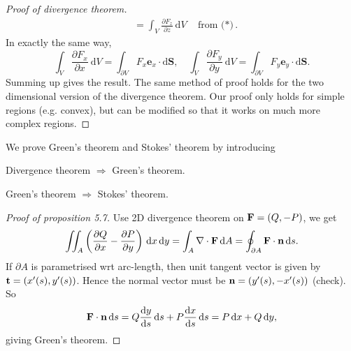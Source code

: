 \begin{proof}[Proof of divergence theorem]
\begin{align*}
        &=\int_{V} \frac{\partial F_{z}}{\partial z} \mathrm{~d} V\quad \text{from ($*$)} .
    \end{align*}
    In exactly the same way, 
    \[
        \int_{V} \frac{\partial F_{x}}{\partial x} \mathrm{~d} V=\int_{\partial V} F_{x} \mathbf{e}_{x} \cdot \mathrm{d} \mathbf{S}, \quad \int_{V} \frac{\partial F_{y}}{\partial y} \mathrm{~d} V=\int_{\partial V} F_{y} \mathbf{e}_{y} \cdot \mathrm{d} \mathbf{S} .
    \]
    Summing up gives the result. The same method of proof holds for the two dimensional version of the divergence theorem. Our proof only holds for simple regions (e.g. convex), but can be modified so that it works on much more complex regions.
\end{proof}

We prove Green's theorem and Stokes' theorem by introducing 
\begin{proposition}
    Divergence theorem $ \Longrightarrow  $ Green's theorem.
\end{proposition}
\begin{proposition}
    Green's theorem $ \Longrightarrow  $ Stokes' theorem.
\end{proposition}
\begin{proof}[Proof of proposition 5.7]
    Use 2D divergence theorem on $ {\bf F} = (Q,-P) $, we get 
    \[
        \iint_{A} \left( \frac{\partial Q}{\partial x}-\frac{\partial P}{\partial y}   \right)\,\mathrm{d} x\,\mathrm{d} y = \int_{A} \nabla\cdot{\bf F} \,\mathrm{d}A  = \oint_{\partial A} {\bf F} \cdot \mathbf{n}\,\mathrm{d} s.
    \]
    If $ \partial A $ is parametrised wrt arc-length, then unit tangent vector is given by $ {\bf t}=(x'(s),y'(s)) $. Hence the normal vector must be $ {\bf n} = (y'(s),-x'(s)) $ (check). So 
    \[
        {\bf F} \cdot \mathbf{n} \,\mathrm{d} s = Q \frac{\mathrm{d}y}{\mathrm{d}s}\,\mathrm{d} s+ P \frac{\mathrm{d}x}{\mathrm{d}s}\,\mathrm{d} s = P\,\mathrm{d} x+Q\,\mathrm{d} y,
    \]
    giving Green's theorem.
\end{proof}
